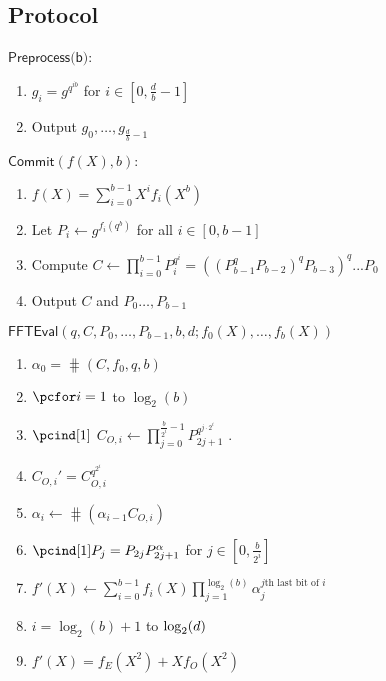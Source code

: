 \documentclass[12pt]{article}
\theoremstyle{Definition}
\begin{document}
\subsection{Protocol}
\begin{mdframed}
$\textsf{Preprocess(b)}$:
\begin{enumerate}[nolistsep]
	\item $g_i=g^{q^{ib}}$ for $i \in [0,\frac{d}{b}-1]$
	\item Output $g_0,\dots,g_{\frac{d}{b}-1}$
\end{enumerate}
$\textsf{Commit}(f(X),b):$
\begin{enumerate}[nolistsep]
	\item $f(X)=\sum_{i=0}^{b-1} X^{i} f_i(X^{b})$ 
	\item Let $P_i\gets g^{f_i(q^b)}$ for all $i \in [0,b-1]$
	\item Compute $C\gets \prod_{i=0}^{b-1} P_i^{q^i}=((P_{b-1}^q P_{b-2})^q P_{b-3})^q...P_0$ 
	\item Output $C$ and $P_{0}\dots,P_{b-1}$
\end{enumerate}
$\textsf{FFTEval}(q,C,P_0,\dots,P_{b-1},b,d;f_0(X),\dots,f_{b}(X))$
\begin{enumerate}[nolistsep]
		\item $\alpha_0=\hash(C,f_0,q,b)$ 
		\item $\pcfor i=1$ to $\log_2(b)$
		\item $\pcind[1]$ $C_{O,i}\gets\prod_{j=0}^{\frac{b}{2^i}-1} P_{2j+1}^{q^{j\cdot 2^i}}$ .
		\item \pcind[1] $C_{O,i}'=C_{O,i}^{q^{2^i}}$ 
		\item \pcind[1] $\alpha_i\gets \hash(\alpha_{i-1} C_{O,i})$ 
		\item $\pcind[1] P_{j}=P_{2j}P_{2j+1}^{\alpha}$ for $j \in [0,\frac{b}{2^i}]$
		\item $f'(X)\gets \sum_{i=0}^{b-1} f_i(X) \prod_{j=1}^{\log_2(b)} \alpha_j^{j\text{th last bit of }i}$ 
		\item \pcfor $i=\log_2(b)+1$ to $\log_2(d)$
		\item \pcind[1] $f'(X)=f_E(X^2)+Xf_O(X^2)$

\end{enumerate}
\end{mdframed}
\end{document}
